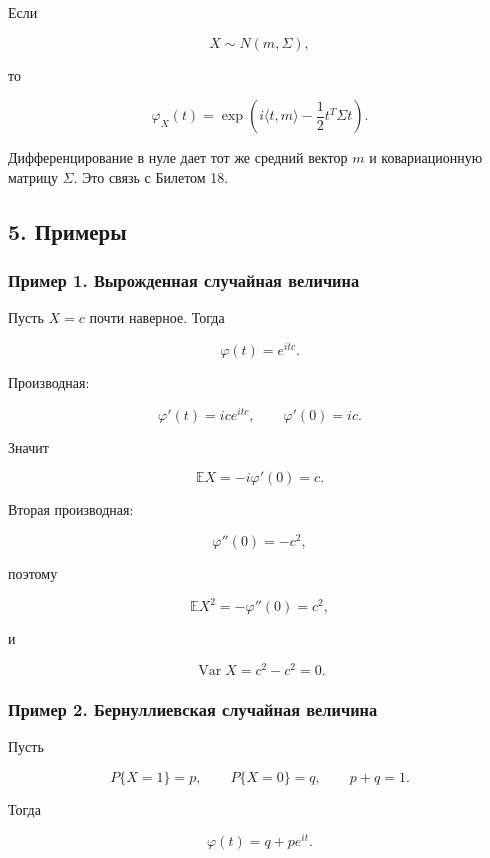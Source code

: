 \documentclass[
  11pt,
  a4paper,
]{article}
\begin{document}
Если

\[
X\sim N(m,\Sigma),
\]

то

\[
\varphi_X(t)
=
\exp\left(i\langle t,m\rangle-\frac12 t^T\Sigma t\right).
\]

Дифференцирование в нуле дает тот же средний вектор \(m\) и
ковариационную матрицу \(\Sigma\). Это связь с Билетом 18.

\subsection{5. Примеры}\label{ux43fux440ux438ux43cux435ux440ux44b}

\subsubsection{Пример 1. Вырожденная случайная
величина}\label{ux43fux440ux438ux43cux435ux440-1.-ux432ux44bux440ux43eux436ux434ux435ux43dux43dux430ux44f-ux441ux43bux443ux447ux430ux439ux43dux430ux44f-ux432ux435ux43bux438ux447ux438ux43dux430}

Пусть \(X=c\) почти наверное. Тогда

\[
\varphi(t)=e^{itc}.
\]

Производная:

\[
\varphi'(t)=ice^{itc},
\qquad
\varphi'(0)=ic.
\]

Значит

\[
\mathbb EX=-i\varphi'(0)=c.
\]

Вторая производная:

\[
\varphi''(0)=-c^2,
\]

поэтому

\[
\mathbb EX^2=-\varphi''(0)=c^2,
\]

и

\[
\operatorname{Var}X=c^2-c^2=0.
\]

\subsubsection{Пример 2. Бернуллиевская случайная
величина}\label{ux43fux440ux438ux43cux435ux440-2.-ux431ux435ux440ux43dux443ux43bux43bux438ux435ux432ux441ux43aux430ux44f-ux441ux43bux443ux447ux430ux439ux43dux430ux44f-ux432ux435ux43bux438ux447ux438ux43dux430}

Пусть

\[
P\{X=1\}=p,
\qquad
P\{X=0\}=q,
\qquad
p+q=1.
\]

Тогда

\[
\varphi(t)=q+pe^{it}.
\]
\end{document}
